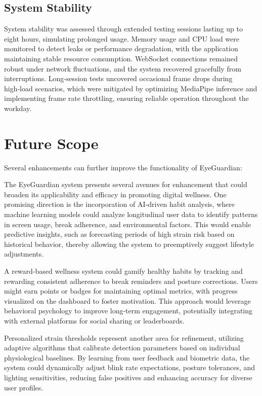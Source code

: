 \documentclass[12pt]{report}
\begin{document}
\section{System Stability}

System stability was assessed through extended testing sessions lasting up to eight hours, simulating prolonged usage. Memory usage and CPU load were monitored to detect leaks or performance degradation, with the application maintaining stable resource consumption. WebSocket connections remained robust under network fluctuations, and the system recovered gracefully from interruptions. Long‑session tests uncovered occasional frame drops during high‑load scenarios, which were mitigated by optimizing MediaPipe inference and implementing frame rate throttling, ensuring reliable operation throughout the workday.


\chapter{Future Scope}

Several enhancements can further improve the functionality of EyeGuardian:

The EyeGuardian system presents several avenues for enhancement that could broaden its applicability and efficacy in promoting digital wellness. One promising direction is the incorporation of AI‑driven habit analysis, where machine learning models could analyze longitudinal user data to identify patterns in screen usage, break adherence, and environmental factors. This would enable predictive insights, such as forecasting periods of high strain risk based on historical behavior, thereby allowing the system to preemptively suggest lifestyle adjustments.

A reward‑based wellness system could gamify healthy habits by tracking and rewarding consistent adherence to break reminders and posture corrections. Users might earn points or badges for maintaining optimal metrics, with progress visualized on the dashboard to foster motivation. This approach would leverage behavioral psychology to improve long‑term engagement, potentially integrating with external platforms for social sharing or leaderboards.

Personalized strain thresholds represent another area for refinement, utilizing adaptive algorithms that calibrate detection parameters based on individual physiological baselines. By learning from user feedback and biometric data, the system could dynamically adjust blink rate expectations, posture tolerances, and lighting sensitivities, reducing false positives and enhancing accuracy for diverse user profiles.
\end{document}
